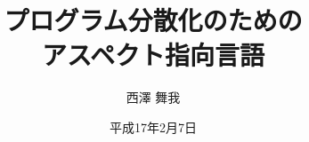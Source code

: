\documentclass[11pt,oneside]{jbook}
\begin{document}
\title{%
プログラム分散化のための\\
アスペクト指向言語
}


\author{西澤 舞我}

\date{平成17年2月7日}





\maketitle


\begin{abstract}

\end{abstract}

\begin{acknowledgments}

\end{acknowledgments}


\tableofcontents       %

%
%

\listoffigures         %
\listoftables          %


\cleardoublepage
{}  %
%
%
%







%
%



\appendix

\end{document}
